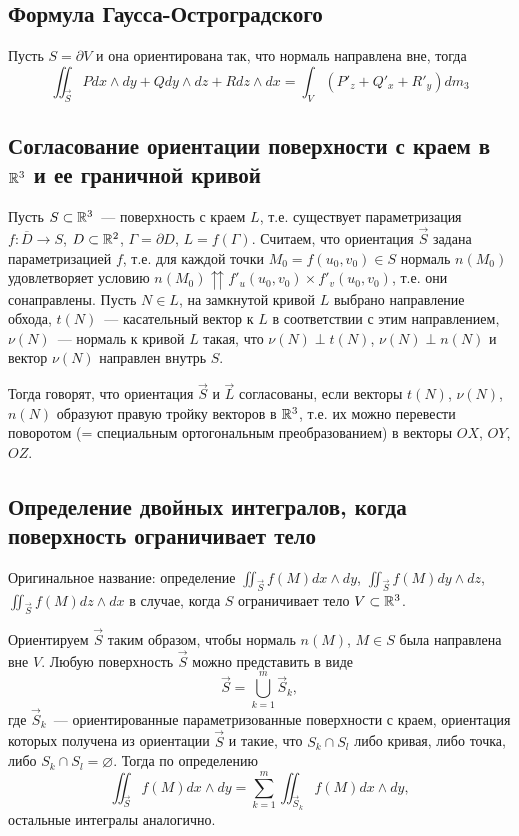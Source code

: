 \documentclass[main]{subfiles}
\begin{document}
\subsection{Формула Гаусса-Остроградского}
Пусть $S = \partial V$ и она ориентирована так, что нормаль направлена вне, тогда
\[\iint_{\overrightarrow{S}} P dx\wedge dy + Q dy \wedge dz + R dz \wedge dx = \int_V (P'_z + Q'_x + R'_y) dm_3\]

\subsection{Согласование ориентации поверхности с краем в \texorpdfstring{$\mathbb{R}^3$}{R\textasciicircum 3} и ее граничной кривой}
Пусть $S \subset \mathbb{R}^3$~--- поверхность с краем $L$, т.е. существует параметризация $f: \overline{D} \to S$, $D \subset \mathbb{R}^2$, $\Gamma = \partial D$, $L = f(\Gamma)$.
Считаем, что ориентация $\overrightarrow{S}$ задана параметризацией $f$, т.е. для каждой точки $M_0 = f(u_0, v_0) \in S$ нормаль $n(M_0)$ удовлетворяет условию $n(M_0) \upuparrows f'_u(u_0, v_0) \times f'_v(u_0, v_0)$, т.е. они сонаправлены.
Пусть $N \in L$, на замкнутой кривой $L$ выбрано направление обхода, $t(N)$~--- касательный вектор к $L$ в соответствии с этим направлением, $\nu(N)$~--- нормаль к кривой $L$ такая, что $\nu(N) \perp t(N)$, $\nu(N) \perp n(N)$ и вектор $\nu(N)$ направлен внутрь $S$.

Тогда говорят, что ориентация $\overrightarrow{S}$ и $\overrightarrow{L}$ согласованы, если векторы $t(N)$, $\nu(N)$, $n(N)$ образуют правую тройку векторов в $\mathbb{R}^3$, т.е. их можно перевести поворотом (= специальным ортогональным преобразованием) в векторы $OX$, $OY$, $OZ$.

\subsection{Определение двойных интегралов, когда поверхность ограничивает тело}
Оригинальное название: определение $\iint_{\overrightarrow{S}} f(M) dx \wedge dy$, $\iint_{\overrightarrow{S}} f(M) dy \wedge dz$, $\iint_{\overrightarrow{S}} f(M) dz \wedge dx$ в случае, когда $S$ ограничивает тело $V \subset \mathbb{R}^3$.

Ориентируем $\overrightarrow{S}$ таким образом, чтобы нормаль $n(M)$, $M \in S$ была направлена вне $V$.
Любую поверхность $\overrightarrow{S}$ можно представить в виде
\[\overrightarrow{S} = \bigcup_{k=1}^m \overrightarrow{S}_k,\]
где $\overrightarrow{S}_k$~--- ориентированные параметризованные поверхности с краем, ориентация которых получена из ориентации $\overrightarrow{S}$ и такие, что $S_k \cap S_l$ либо кривая, либо точка, либо $S_k \cap S_l = \varnothing$.
Тогда по определению
\[\iint_{\overrightarrow{S}} f(M) dx \wedge dy = \sum_{k=1}^{m} \iint_{\overrightarrow{S}_k} f(M) dx \wedge dy,\]
остальные интегралы аналогично.
\end{document}

